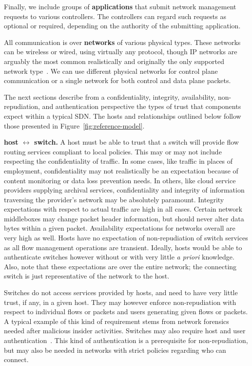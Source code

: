 \documentclass[10pt,conference]{IEEEtran}
\begin{document}
Finally, we include groups of {\bf applications} that submit network management requests to various controllers.  The controllers can regard such requests as optional or required, depending on the authority of the submitting application.

All communication is over {\bf networks} of various physical types.  These networks can be wireless or wired, using virtually any protocol, though IP networks are arguably the most common realistically and originally the only supported network type~\cite{openflow1.0}.  We can use different physical networks for control plane communication or a single network for both control and data plane packets.

The next sections describe from a confidentiality, integrity, availability, non-repudiation, and authentication perspective the types of trust that components expect within a typical SDN.  The hosts and relationships outlined below follow those presented in Figure~\ref{fig:reference-model}.

\noindent
{\bf host $\leftrightarrow$ switch.} A host must be able to trust that a switch will provide flow routing services compliant to local policies.  This may or may not include respecting the confidentiality of traffic. In some cases, like traffic in places of employment, confidentiality may not realistically be an expectation because of content monitoring or data loss prevention needs.  In others, like cloud service providers supplying archival services, confidentiality and integrity of information traversing the provider's network may be absolutely paramount.  Integrity expectations with respect to actual traffic are high in all cases.  Certain network middleboxes may change packet header information, but should never alter data bytes within a given packet.  Availability expectations for networks overall are very high as well.  Hosts have no expectation of non-repudiation of switch services as all flow management operations are transient.  Ideally, hosts would be able to authenticate switches however without or with very little {\sl a priori} knowledge.  Also, note that these expectations are over the entire network; the connecting switch is just representative of the network to the host.

Switches do not access services provided by hosts, and need to have very little trust, if any, in a given host.  They may however enforce non-repudiation with respect to individual flows or packets and users generating given flows or packets.  A typical example of this kind of requirement stems from network forensics needed after malicious insider activities. Switches may also require host and user authentication~\cite{CaFrPeLu:07}.  This kind of authentication is a prerequisite for non-repudiation, but may also be needed in networks with strict policies regarding who can connect.
\end{document}
